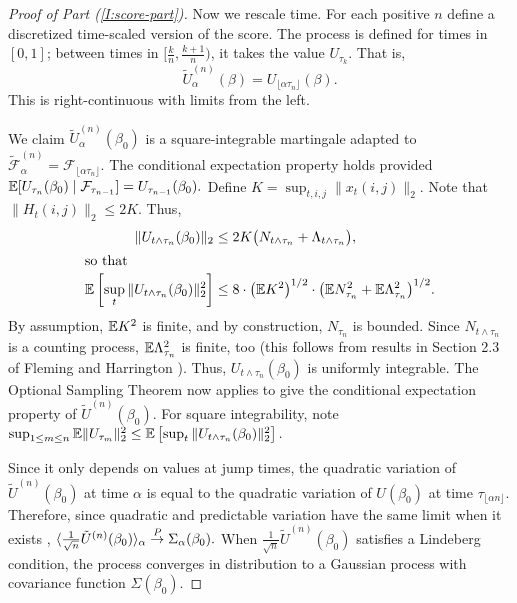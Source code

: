 \documentclass[aoas,preprint]{imsart}
\begin{document}
\begin{proof}[Proof of Part \textit{(\ref{I:score-part})}]
Now we rescale time.
For each positive $n$ define a discretized time-scaled version of the score.  
The process is defined for times in $[0,1]$; between times in
$[\tfrac{k}{n}, \tfrac{k+1}{n})$, it takes the value $U_{\tau_k}$.  That is,
\[
    \tilde U_{\alpha}^{(n)}(\beta)
        = U_{\lfloor \alpha \tau_n \rfloor}(\beta).
\]
This is right-continuous with limits from the left.

We claim $\tilde U_\alpha^{(n)}(\beta_0)$ is a square-integrable martingale
adapted to
\(
    \mathcal{\tilde F}^{(n)}_\alpha
        =
        \mathcal{F}_{\lfloor \alpha \tau_n \rfloor}.
\)
The conditional expectation property holds provided
\(
    \mathbb{E}[ U_{\tau_{n}}(\beta_0) \mid \mathcal{F}_{\tau_{n-1}} ]
        = U_{\tau_{n-1}}(\beta_0).
\)
Define $K = \sup_{t,i,j} \| x_{t}(i,j) \|_2$.
Note that $\|H_{t}(i,j)\|_2 \leq 2 K$.  Thus,
\begin{align*}
    \| U_{t \wedge \tau_n} (\beta_0) \|_2
        &\leq
            2 K
            \big(
                N_{t \wedge \tau_n}
                +
                \Lambda_{t \wedge \tau_n}
            \big), \\
\intertext{so that}
    \E \left[
        \sup_t
        \| U_{t \wedge \tau_n} (\beta_0) \|_2^2
    \right]
        &\leq
            8 \cdot \big(\E K^2\big)^{1/2} \cdot
            \big(
              \E N_{\tau_n}^2
              +
              \E \Lambda_{\tau_n}^2              
            \big)^{1/2}.
\end{align*}
By assumption, $\mathbb{E} K^2$ is finite, and by construction, $N_{\tau_n}$ is
bounded.  Since $N_{t \wedge \tau_n}$ is a counting process,
$\mathbb{E} \Lambda_{\tau_n}^2$ is finite, too
(this follows from results in Section 2.3 of Fleming and Harrington
\cite{fleming1991counting}).  Thus, $U_{t \wedge \tau_n}(\beta_0)$
is uniformly integrable.  The Optional Sampling Theorem now applies to
give the conditional expectation property of $\tilde U^{(n)}(\beta_0)$.  For
square integrability, note
\(
    \sup_{1 \leq m \leq n}
    \mathbb{E} \| U_{\tau_m} \|_2^2
        \leq
        \mathbb{E} \left[
           \sup_t
           \| U_{t \wedge \tau_n} (\beta_0) \|_2^2
        \right].
\)

Since it only depends on values at jump times, the
quadratic variation of $\tilde U^{(n)}(\beta_0)$ at time $\alpha$ is
equal to the quadratic variation of $U(\beta_0)$ at time
$\tau_{\lfloor \alpha n \rfloor}$.  Therefore, since quadratic and predictable
variation have the same limit when it exists
\cite[Prop. 1]{rebolledo1980central},
\(
    \langle \frac{1}{\sqrt{n}} \tilde U^{(n)}(\beta_0) \rangle_\alpha
        \overset{\mathit{P}}{\to}
            \Sigma_\alpha(\beta_0).
\)
When $\frac{1}{\sqrt{n}} \tilde U^{(n)}(\beta_0)$ satisfies a Lindeberg condition,
the process converges in distribution to a Gaussian process with covariance
function $\Sigma(\beta_0).$


\end{proof}
\end{document}
